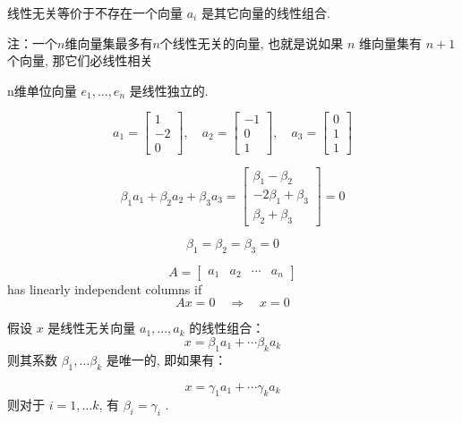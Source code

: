 线性无关等价于不存在一个向量 $ a_{i} $ 是其它向量的线性组合. 

\begin{corollary}
    注：一个$n$维向量集最多有$n$个线性无关的向量, 也就是说如果 $ {n} $ 维向量集有 $ {n}+1 $ 个向量, 那它们必线性相关
\end{corollary}

\begin{example}
    n维单位向量 $ e_{1}, \ldots, e_{n} $ 是线性独立的. 
\end{example}

\begin{example}
    $$ a_{1}=\left[\begin{array}{c}1 \\ -2 \\ 0\end{array}\right], \quad a_{2}=\left[\begin{array}{c}-1 \\ 0 \\ 1\end{array}\right], \quad a_{3}=\left[\begin{array}{l}0 \\ 1 \\ 1\end{array}\right] $$

    $$ \beta_{1} a_{1}+\beta_{2} a_{2}+\beta_{3} a_{3}=\left[\begin{array}{c}\beta_{1}-\beta_{2} \\ -2 \beta_{1}+\beta_{3} \\ \beta_{2}+\beta_{3}\end{array}\right]=0 $$

    $$ \beta_{1}=\beta_{2}=\beta_{3}=0 $$
\end{example}


\begin{corollary}
    $$
A=\left[\begin{array}{llll}
a_{1} & a_{2} & \cdots & a_{n}
\end{array}\right]
$$
has linearly independent columns if
$$
A x=0 \quad \Longrightarrow \quad x=0
$$
\end{corollary}

\begin{theorem}
    假设 $ x $ 是线性无关向量 $ a_{1}, \ldots, a_{k} $ 的线性组合：
$$
x=\beta_{1} a_{1}+\cdots \beta_{k} a_{k}
$$
则其系数 $ \beta_{1}, \ldots \beta_{k} $ 是唯一的, 即如果有：

$$
x=\gamma_{1} a_{1}+\cdots \gamma_{k} a_{k}
$$
则对于 $ i=1, \ldots k $, 有 $ \beta_{i}=\gamma_{i} $ . 
\end{theorem}

